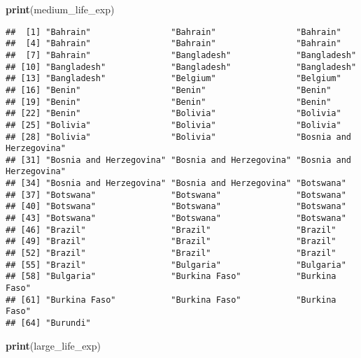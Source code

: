 \documentclass[]{article}
\newenvironment{Shaded}{\begin{snugshade}}{\end{snugshade}}
\newcommand{\KeywordTok}[1]{\textcolor[rgb]{0.13,0.29,0.53}{\textbf{#1}}}
\newcommand{\NormalTok}[1]{#1}
\begin{document}
\begin{Shaded}
\begin{Highlighting}[]
\KeywordTok{print}\NormalTok{(medium_life_exp)}
\end{Highlighting}
\end{Shaded}

\begin{verbatim}
##  [1] "Bahrain"                "Bahrain"                "Bahrain"               
##  [4] "Bahrain"                "Bahrain"                "Bahrain"               
##  [7] "Bahrain"                "Bangladesh"             "Bangladesh"            
## [10] "Bangladesh"             "Bangladesh"             "Bangladesh"            
## [13] "Bangladesh"             "Belgium"                "Belgium"               
## [16] "Benin"                  "Benin"                  "Benin"                 
## [19] "Benin"                  "Benin"                  "Benin"                 
## [22] "Benin"                  "Bolivia"                "Bolivia"               
## [25] "Bolivia"                "Bolivia"                "Bolivia"               
## [28] "Bolivia"                "Bolivia"                "Bosnia and Herzegovina"
## [31] "Bosnia and Herzegovina" "Bosnia and Herzegovina" "Bosnia and Herzegovina"
## [34] "Bosnia and Herzegovina" "Bosnia and Herzegovina" "Botswana"              
## [37] "Botswana"               "Botswana"               "Botswana"              
## [40] "Botswana"               "Botswana"               "Botswana"              
## [43] "Botswana"               "Botswana"               "Botswana"              
## [46] "Brazil"                 "Brazil"                 "Brazil"                
## [49] "Brazil"                 "Brazil"                 "Brazil"                
## [52] "Brazil"                 "Brazil"                 "Brazil"                
## [55] "Brazil"                 "Bulgaria"               "Bulgaria"              
## [58] "Bulgaria"               "Burkina Faso"           "Burkina Faso"          
## [61] "Burkina Faso"           "Burkina Faso"           "Burkina Faso"          
## [64] "Burundi"
\end{verbatim}

\begin{Shaded}
\begin{Highlighting}[]
\KeywordTok{print}\NormalTok{(large_life_exp)}
\end{Highlighting}
\end{Shaded}
\end{document}
